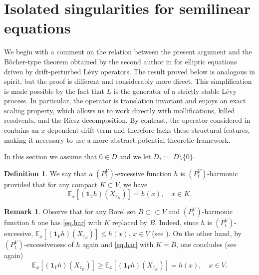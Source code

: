 \documentclass[11pt,a4paper,reqno]{amsart}
\theoremstyle{definition}
\newtheorem{definition}[theorem]{Definition}
\newtheorem{remark}[theorem]{Remark}
\numberwithin{equation}{section}
\begin{document}
\section{Isolated   singularities for semilinear equations}
\label{sec6}


We begin with a comment on the relation between the present argument and the B\^ocher-type 
theorem obtained by the second author in \cite{KlimsiakBocher2026} for elliptic equations driven by 
drift-perturbed L\'evy operators. The result proved below is analogous in spirit, but the proof is different and considerably 
more direct. This simplification is made possible by the fact that \(L\) is the generator of a strictly stable L\'evy process. 
In particular, the operator is translation invariant and enjoys an exact scaling property, which allows us to work directly 
with mollifications, killed resolvents, and the Riesz decomposition. By contrast, the operator considered in 
\cite{KlimsiakBocher2026} contains an \(x\)-dependent drift term and therefore lacks these structural features, 
making it necessary to use a more abstract potential-theoretic framework.


In this section  we assume that $0\in D$ and we let $D_*:=D\setminus\{0\}$.





\begin{definition}
We say that a $(P^V_t)$-excessive   function $h$  is $(P^V_t)$-harmonic provided that for any compact $K\subset V$, we have
\begin{equation}
\label{eq.har}
\mathbb E_x[(\mathbf1_{V}h)(X_{\tau_K})]=h(x),\quad x\in K.
\end{equation}
\end{definition}

\begin{remark}
\label{rem.harmf}
Observe that for any Borel set $B\subset\subset V$ and  $(P^V_t)$-harmonic
function $h$ one has \eqref{eq.har} with $K$ replaced by $B$. Indeed, since $h$
is $(P^V_t)$-excessive, $\mathbb E_x[(\mathbf1_Vh)(X_{\tau_B})]\le h(x),\, x\in V$ (see \cite[Theorem III.5.7]{BG}). 
On the other hand, by $(P^V_t)$-excessiveness of $h$ again  and \eqref{eq.har}
with $K=\overline{B}$, one concludes (see \cite[Theorem III.5.7]{BG} again)
\[
\mathbb E_x[(\mathbf1_Vh)(X_{\tau_B})]\ge \mathbb E_x[(\mathbf1_Vh)(X_{\tau_K})]=h(x),\quad x\in V. 
\]


\end{remark}
\end{document}
